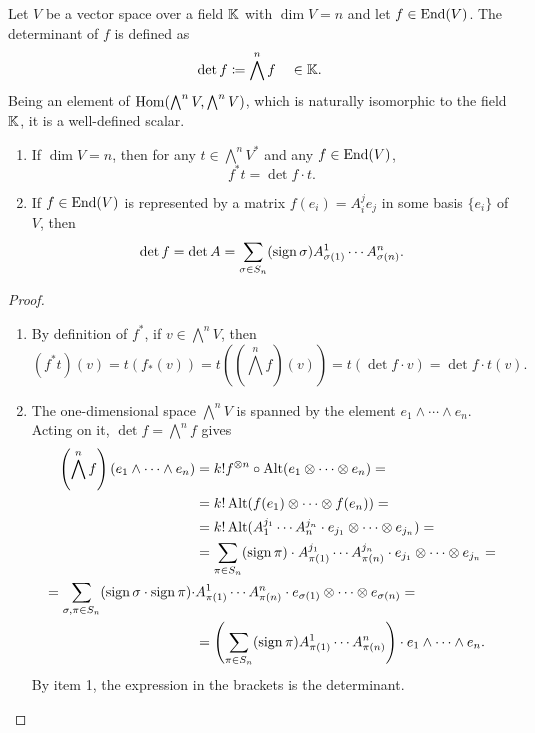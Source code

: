 \begin{defn}
Let $V$ be a vector space over a field $\mathbb{K}$ with $\dim V=n$ and let $f\in\operatorname{End}(V)$. The determinant of $f$ is defined as 
\[\det f\coloneqq \bigwedge^n f\quad \in\mathbb{K}.\] 
Being an element of $\operatorname{Hom}(\bigwedge^n V,\bigwedge^n V)$, which is naturally isomorphic to the field $\mathbb{K}$, it is a well-defined scalar. 
\end{defn}
\begin{prop}
\begin{enumerate}
    \item If $\dim V=n$, then for any $t\in\bigwedge^n V^\ast$ and any $f\in\operatorname{End}(V)$, 
    \[f^\ast t=\det f\cdot t.\]
    \item If $f\in\operatorname{End}(V)$ is represented by a matrix $f(e_i)=A_i^j e_j$ in some basis $\{e_i\}$ of $V$, then
    \[\det f=\det A=\sum_{\sigma\in S_n}(\operatorname{sign}\sigma)A^1_{\sigma(1)}\cdots A^n_{\sigma(n)}.\]
\end{enumerate}
\end{prop}
\begin{proof}
\begin{enumerate}
    \item By definition of $f^\ast$, if $v\in \bigwedge^n V$, then 
    \[(f^\ast t)(v)=t\left(f_\ast(v)\right)=t\left(\left(\bigwedge^n f\right)(v)\right)=t(\det f\cdot v)=\det f\cdot t(v).\]
    \item The one-dimensional space $\bigwedge^n V$ is spanned by the element $e_1\wedge \cdots \wedge e_n$. Acting on it, $\det f=\bigwedge^n f$ gives
    \begin{align}
        \left(\bigwedge^n f\right)(e_1\wedge \cdots \wedge e_n)&=k!f^{\otimes n}\circ \operatorname{Alt} (e_1\otimes \cdots \otimes e_n)=\\
        &=k!\operatorname{Alt}(f(e_1)\otimes\cdots\otimes f(e_n))=\notag
        \\
        &=k! \operatorname{Alt} (A^{j_1}_1 \cdots A^{j_n}_n \cdot e_{j_1}\otimes\cdots \otimes e_{j_n})=\\
        &=\sum_{\pi\in S_n}(\operatorname{sign}\pi)\cdot A_{\pi(1)}^{j_1}\cdots A_{\pi(n)}^{j_n}\cdot  e_{j_1}\otimes\cdots\otimes e_{j_n}=\notag
        \\
        =\sum_{\sigma,\pi\in S_n}(\operatorname{sign}\sigma\cdot\operatorname{sign}\pi) \cdot &A_{\pi(1)}^1\cdots A_{\pi(n)}^n\cdot e_{\sigma(1)}\otimes\cdots\otimes e_{\sigma(n)}=\notag
        \\
        &=\left(\sum_{\pi\in S_n}(\operatorname{sign}\pi)A^1_{\pi(1)}\cdots A^n_{\pi(n)}\right)\cdot e_1\wedge \cdots \wedge e_n.
    \end{align}
    By item 1, the expression in the brackets is the determinant.
\end{enumerate}
\end{proof}

